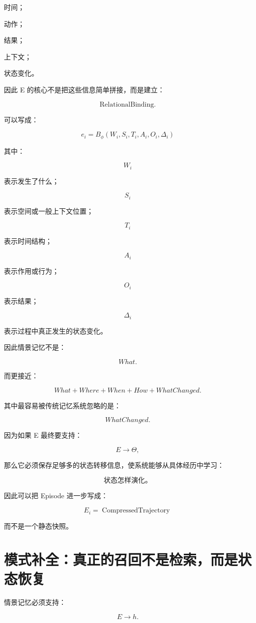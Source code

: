 时间；

动作；

结果；

上下文；

状态变化。

因此 E 的核心不是把这些信息简单拼接，而是建立：

\[
\boxed{
\text{RelationalBinding}.
}
\]

可以写成：

\[
\boxed{
e_i
=
B_{\phi}
(
W_i,
S_i,
T_i,
A_i,
O_i,
\Delta_i
)
}
\]

其中：

\[
W_i
\]

表示发生了什么；

\[
S_i
\]

表示空间或一般上下文位置；

\[
T_i
\]

表示时间结构；

\[
A_i
\]

表示作用或行为；

\[
O_i
\]

表示结果；

\[
\Delta_i
\]

表示过程中真正发生的状态变化。

因此情景记忆不是：

\[
\boxed{
What.
}
\]

而更接近：

\[
\boxed{
What
+
Where
+
When
+
How
+
WhatChanged.
}
\]

其中最容易被传统记忆系统忽略的是：

\[
\boxed{
WhatChanged.
}
\]

因为如果 E 最终要支持：

\[
E\rightarrow\Theta,
\]

那么它必须保存足够多的状态转移信息，使系统能够从具体经历中学习：

\[
\boxed{
\text{状态怎样演化。}
}
\]

因此可以把 Episode 进一步写成：

\[
\boxed{
E_i
=
\operatorname{CompressedTrajectory}
}
\]

而不是一个静态快照。


\section{模式补全：真正的召回不是检索，而是状态恢复}

情景记忆必须支持：

\[
\boxed{
E\rightarrow h.
}
\]

